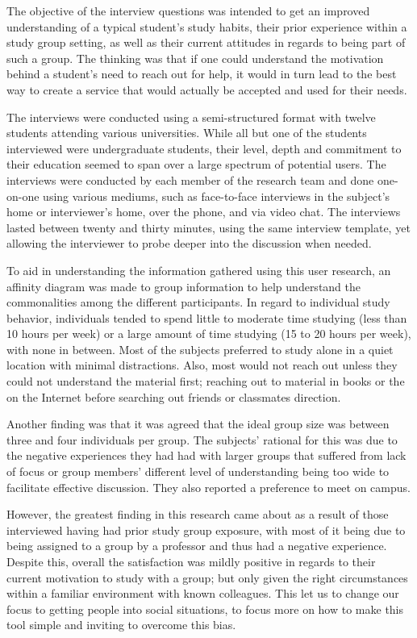 \documentclass{sigchi-ext}
\begin{document}
The objective of the interview questions was intended to get an improved
understanding of a typical student’s study habits, their prior experience
within a study group setting, as well as their current attitudes in regards
to being part of such a group. The thinking was that if one could
understand the motivation behind a student’s need to reach out for help, it
would in turn lead to the best way to create a service that would actually
be accepted and used for their needs.

The interviews were conducted using a semi-structured format with twelve
students attending various universities. While all but one of the students
interviewed were undergraduate students, their level, depth and commitment
to their education seemed to span over a large spectrum of potential users.
The interviews were conducted by each member of the research team and done
one-on-one using various mediums, such as face-to-face interviews in the
subject’s home or interviewer’s home, over the phone, and via video chat.
The interviews lasted between twenty and thirty minutes, using the same
interview template, yet allowing the interviewer to probe deeper into the
discussion when needed.

To aid in understanding the information gathered using this user research,
an affinity diagram was made to group information to help understand the
commonalities among the different participants. In regard to individual
study behavior, individuals tended to spend little to moderate time
studying (less than 10 hours per week) or a large amount of time studying
(15 to 20 hours per week), with none in between. Most of the subjects
preferred to study alone in a quiet location with minimal distractions.
Also, most would not reach out unless they could not understand the
material first; reaching out to material in books or the on the Internet
before searching out friends or classmates direction.

Another finding was that it was agreed that the ideal group size was
between three and four individuals per group. The subjects’ rational for
this was due to the negative experiences they had had with larger groups
that suffered from lack of focus or group members’ different level of
understanding being too wide to facilitate effective discussion. They also
reported a preference to meet on campus.

However, the greatest finding in this research came about as a result of
those interviewed having had prior study group exposure, with most of it
being due to being assigned to a group by a professor and thus had a
negative experience. Despite this, overall the satisfaction was mildly
positive in regards to their current motivation to study with a group; but
only given the right circumstances within a familiar environment with known
colleagues. This let us to change our focus to getting people into social
situations, to focus more on how to make this tool simple and inviting to
overcome this bias.
\end{document}
